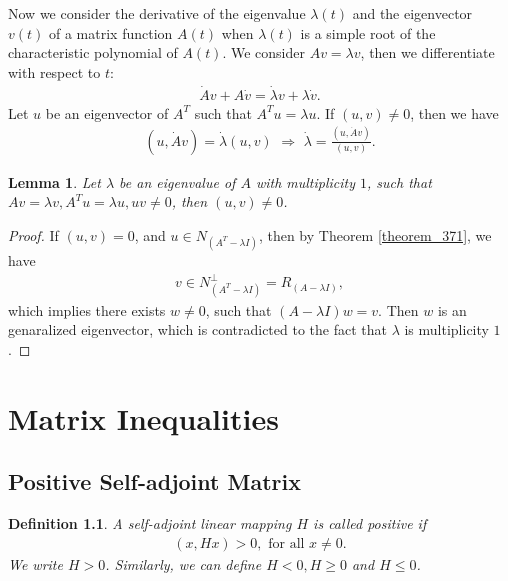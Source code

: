 \documentclass[10pt]{book}
\newtheorem{definition}{Definition}[chapter]
\newtheorem{lemma}[theorem]{Lemma}
\theoremstyle{definition}
\numberwithin{equation}{chapter}
\begin{document}
Now we consider the derivative of the eigenvalue $\lambda(t)$ and the eigenvector $v(t)$ of a matrix function $A(t)$ when $\lambda(t)$ is a simple root of the characteristic polynomial of $A(t)$. We consider $Av = \lambda v$, then we differentiate with respect to $t$:
\begin{align*}
    \dot{A}v + A\dot{v} = \dot{\lambda}v + \lambda \dot{v}.
\end{align*}
Let $u$ be an eigenvector of $A^T$ such that $A^T u = \lambda u$. If $(u,v)\neq 0$, then we have
\begin{align*}
    (u,\dot{A}v) = \dot{\lambda} (u,v)\,\, \Rightarrow \,\, \dot{\lambda} = \frac{(u,\dot{A}v)}{(u,v)}.
\end{align*}

\begin{lemma}
Let $\lambda$ be an eigenvalue of $A$ with multiplicity $1$, such that $Av = \lambda v, A^Tu = \lambda u, uv \neq 0$, then $(u,v)\neq 0$.
\end{lemma}
\begin{proof}
If $(u,v) = 0$, and $u\in N_{\left(A^T - \lambda I\right)}$, then by Theorem \ref{theorem_371}, we have 
\begin{align*}
    v \in N_{\left(A^T - \lambda I\right)}^\perp = R_{\left(A - \lambda I\right)},
\end{align*}
which implies there exists $w\neq 0$, such that $(A - \lambda I)w = v$. Then $w$ is an genaralized eigenvector, which is contradicted to the fact that $\lambda$ is multiplicity $1$.
\end{proof}

\medskip


\chapter{Matrix Inequalities}\label{matrix_inequalities}

\section{Positive Self-adjoint Matrix}

\begin{definition}
A self-adjoint linear mapping $H$ is called positive if 
\begin{align*}
    (x, Hx) > 0,\,\, \text{for all} \,\, x \neq 0.
\end{align*}
We write $H > 0$. Similarly, we can define $H < 0, H \geq 0$ and $H \leq 0$.
\end{definition}
\end{document}
